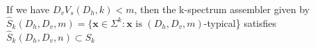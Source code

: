 \documentclass[preview]{standalone}
\begin{document}
\begin{center}
If we have ${D}_v{V}_s({D}_h, k) < m$, then the k-spectrum assembler given by $\hat{S}_k({D}_h, {D}_v, m) = \{\textbf{x} \in \Sigma^k: \textbf{x} \text{ is }({D}_h, {D}_v, m)$-typical\} satisfies $\hat{S}_k({D}_h, {D}_v, n) \subset {S}_k$
\end{center}
\end{document}

